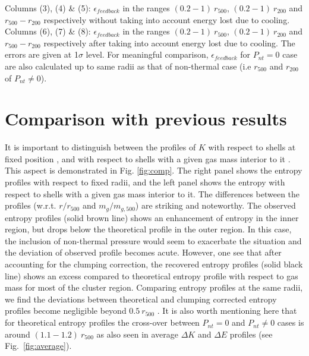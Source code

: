 \documentclass[a4paper,fleqn,usenatbib]{mnras}
\begin{document}
\begin{table*}
 Columns (3), (4) \& (5): $\epsilon_{feedback}$ in the ranges $(0.2-1)~r_{500}$, $(0.2-1)~r_{200}$ and $r_{500}-r_{200}$ respectively without taking into account energy lost due to cooling. 
 Columns (6), (7) \& (8): $\epsilon_{feedback}$ in the ranges $(0.2-1)~r_{500}$, $(0.2-1)~r_{200}$ and $r_{500}-r_{200}$ respectively after taking into account energy lost due to cooling. The errors are given at 1$\sigma$ level.
For meaningful comparison, $\epsilon_{feedback}$ for $P_{nt}=0$ case are also calculated up to same radii as that of non-thermal case (i.e $r_{500}$ and $r_{200}$ of $P_{nt}\neq0$).
\end{table*}
\section{Comparison with previous results}
It is important to distinguish between the profiles of $K$  with respect to shells at fixed position \citep{10,Ettori2013}, and with respect to shells with a given gas mass interior to it \citep{Nath2011,Chaudhuri2012,Chaudhuri2013}. This aspect is demonstrated in Fig. \ref{fig:comp}. The right panel shows the entropy profiles with respect to fixed radii, and the left panel shows the entropy with respect to shells with a given gas mass interior to it. The differences between the profiles (w.r.t. $r/r_{500}$ and $m_g/m_{g,500}$) are striking and noteworthy. The observed entropy profiles (solid brown line) shows an enhancement of entropy in the inner region, but drops below the theoretical profile in the outer region. In this case, the inclusion of non-thermal pressure would seem  to exacerbate the situation and the deviation of observed profile becomes acute. However, one see that after accounting for the clumping correction, the recovered  entropy profiles (solid black line) shows an excess compared to theoretical entropy profile with respect to gas mass for most of the cluster region. Comparing entropy profiles at the same radii, we find the deviations between theoretical and clumping corrected entropy profiles become negligible beyond $0.5~r_{500}$ . It is also worth mentioning here that for theoretical entropy profiles the cross-over between $P_{nt}=0$ and $P_{nt}\neq0$  cases is around $(1.1-1.2)~r_{500}$ as also seen in average $\Delta K$ and $\Delta E$ profiles (see Fig.~\ref{fig:average}).  
\end{document}
